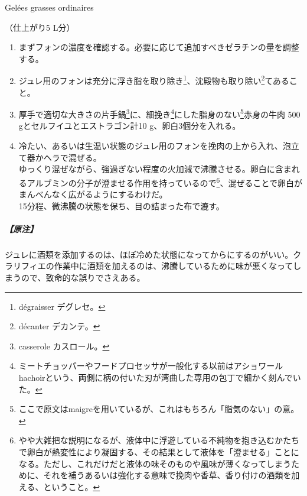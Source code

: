 \begin{recette}
\begin{frsubenv}

Gelées grasses ordinaires

\end{frsubenv}


（仕上がり5 L分）

\begin{enumerate}
\def\labelenumi{\arabic{enumi}.}
\item
  まずフォンの濃度を確認する。必要に応じて追加すべきゼラチンの量を調整する。
\item
  ジュレ用のフォンは充分に浮き脂を取り除き\footnote{dégraisser
    デグレセ。}、沈殿物も取り除い\footnote{décanter デカンテ。}てあること。
\item
  厚手で適切な大きさの片手鍋\footnote{casserole カスロール。}に、細挽き\footnote{ミートチョッパーやフードプロセッサが一般化する以前はアショワールhachoirという、両側に柄の付いた刃が湾曲した専用の包丁で細かく刻んでいた。}にした脂身のない\footnote{ここで原文はmaigreを用いているが、これはもちろん「脂気のない」の意。}赤身の牛肉
  500 gとセルフイユとエストラゴン計10 g、卵白3個分を入れる。
\item
  冷たい、あるいは生温い状態のジュレ用のフォンを挽肉の上から入れ、泡立て器かヘラで混ぜる。\\
  ゆっくり混ぜながら、強過ぎない程度の火加減で沸騰させる。卵白に含まれるアルブミンの分子が澄ませる作用を持っているので\footnote{やや大雑把な説明になるが、液体中に浮遊している不純物を抱き込むかたちで卵白が熱変性により凝固する、その結果として液体を「澄ませる」ことになる。ただし、これだけだと液体の味そのものや風味が薄くなってしまうために、それを補うあるいは強化する意味で挽肉や香草、香り付けの酒類を加える、ということ。}、混ぜることで卵白がまんべんなく広がるようにするわけだ。\\
  15分程、微沸騰の状態を保ち、目の詰まった布で漉す。
\end{enumerate}

\hypertarget{nota-gelees-grasses-ordinaires}{%
\subparagraph{【原注】}\label{nota-gelees-grasses-ordinaires}}

ジュレに酒類を添加するのは、ほぼ冷めた状態になってからにするのがいい。クラリフィエの作業中に酒類を加えるのは、沸騰しているために味が悪くなってしまうので、致命的な誤りでさえある。


\end{recette}
